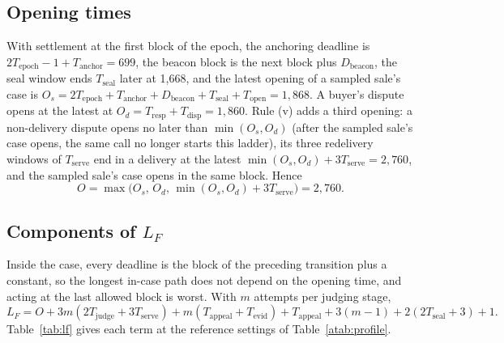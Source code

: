 \documentclass[10pt,a4paper]{article}
\theoremstyle{plain}
\theoremstyle{remark}
\begin{document}
\subsection{Opening times}

With settlement at the first block of the epoch, the anchoring deadline is $2T_{\mathrm{epoch}}-1+T_{\mathrm{anchor}}=699$, the beacon block is the next block plus $D_{\mathrm{beacon}}$, the seal window ends $T_{\mathrm{seal}}$ later at 1,668, and the latest opening of a sampled sale's case is $O_s=2T_{\mathrm{epoch}}+T_{\mathrm{anchor}}+D_{\mathrm{beacon}}+T_{\mathrm{seal}}+T_{\mathrm{open}}=1{,}868$. A buyer's dispute opens at the latest at $O_d=T_{\mathrm{resp}}+T_{\mathrm{disp}}=1{,}860$. Rule (v) adds a third opening: a non-delivery dispute opens no later than $\min(O_s,O_d)$ (after the sampled sale's case opens, the same call no longer starts this ladder), its three redelivery windows of $T_{\mathrm{serve}}$ end in a delivery at the latest $\min(O_s,O_d)+3T_{\mathrm{serve}}=2{,}760$, and the sampled sale's case opens in the same block. Hence
\[
O=\max\big(O_s,\,O_d,\,\min(O_s,O_d)+3T_{\mathrm{serve}}\big)=2{,}760 .
\]

\subsection{Components of $L_F$}

Inside the case, every deadline is the block of the preceding transition plus a constant, so the longest in-case path does not depend on the opening time, and acting at the last allowed block is worst. With $m$ attempts per judging stage,
\[
L_F=O+3m(2T_{\mathrm{judge}}+3T_{\mathrm{serve}})+m(T_{\mathrm{appeal}}+T_{\mathrm{evid}})+T_{\mathrm{appeal}}+3(m-1)+2(2T_{\mathrm{seal}}+3)+1 .
\]
Table~\ref{tab:lf} gives each term at the reference settings of Table~\ref{atab:profile}.
\end{document}
